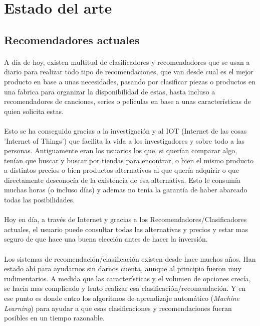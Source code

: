 \section{Estado del arte}
\label{chapter:estado_del_arte}

\subsection{Recomendadores actuales}

\paragraph{}
A día de hoy, existen multitud de clasificadores y recomendadores\cite{ref:sorter_art_1} que se usan a diario para realizar todo tipo de recomendaciones, que van desde cual es el mejor producto en base a unas necesidades, pasando por clasificar piezas o productos en una fabrica para organizar la disponibilidad de estas, hasta incluso a recomendadores de canciones, series o películas en base a unas características de quien solicita estas.

\paragraph{}
Esto se ha conseguido gracias a la investigación y al IOT (Internet de las cosas 'Internet of Things') que facilita la vida a los investigadores y sobre todo a las personas. Antiguamente eran los usuarios los que, si querían comparar algo, tenían que buscar y buscar por tiendas para encontrar, o bien el mismo producto a distintos precios o bien productos alternativos al que quería adquirir o que directamente desconocía de la existencia de esa alternativa. Esto le consumía muchas horas (o incluso días) y ademas no tenia la garantía de haber abarcado todas las posibilidades\cite{ref:traditional_purchase_internet_purchase}.

\paragraph{}
Hoy en día, a través de Internet y gracias a los Recomendadores/Clasificadores actuales, el usuario puede consultar todas las alternativas y precios y estar mas seguro de que hace una buena elección antes de hacer la inversión\cite{ref:internet_comparatives}.

\paragraph{}
Los sistemas de recomendación/clasificación existen desde hace muchos años\cite{ref:history_recommender}. Han estado ahí para ayudarnos sin darnos cuenta, aunque al principio fueron muy rudimentarios. A medida que las características y el volumen de opciones crecía, se hacia mas complicado y lento realizar esa clasificación/recomendación. Y en ese punto es donde entro los algoritmos de aprendizaje automático (\textit{Machine Learning}) para ayudar a que esas clasificaciones y recomendaciones fueran posibles en un tiempo razonable.

